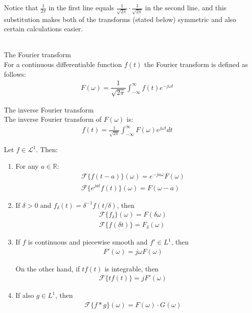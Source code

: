 Notice that $\frac{1}{2\pi}$ in the first line equals $\frac{1}{\sqrt{2\pi}} \cdot \frac{1}{\sqrt{2\pi}}$ in the second line, and this substitution makes both of the transforms (stated below) symmetric and also certain calculations easier. \cite{Page 10, FourierTrans}
\\ \\
\begin{definition}{The Fourier transform}
\\
For a continuous differentiable function $f(t)$ the Fourier transform is defined as follows:
\begin{align*}
F(\omega) = \dfrac{1}{\sqrt{2\pi}} \int_{-\infty}^\infty f(t) e^{-j \omega t}
\end{align*}
\end{definition}

\begin{definition}{The inverse Fourier transform}
\\
The inverse Fourier transform of $F(\omega)$ is:
\begin{align*}
f(t) = \frac{1}{\sqrt{2\pi}} \int_{-\infty}^\infty F(\omega) e^{j \omega t} dt
\end{align*}
\end{definition}

\begin{theorem}
Let $f \in \mathcal{L}^1$. Then:

\begin{enumerate}[label=(\alph*)]
\item For any $a \in \mathbb{R}$:
\begin{align*}
\mathcal{F}\{f(t-a)\}(\omega) = e^{-ja\omega} F(\omega) \\
\mathcal{F}\{e^{jat}f(t)\}(\omega) = F(\omega - a)
\end{align*}

\item If $\delta > 0$ and $f_\delta(t)=\delta^{-1}f(t/\delta)$, then
\begin{align*}
\mathcal{F}\{f_\delta\}(\omega) = F(\delta\omega) \\
\mathcal{F}\{f(\delta t)\} = F_\delta(\omega)
\end{align*}

\item If $f$ is continuous and piecewise smooth and $f' \in L^1$, then
\begin{align*}
F'(\omega) = j\omega F(\omega)
\end{align*}

On the other hand, if $tf(t)$ is integrable, then
\begin{align*}
\mathcal{F}\{tf(t)\} = j F'(\omega)
\end{align*}

\item If also $g \in L^1$, then
\begin{align*}
\mathcal{F}\{f*g\}(\omega) = F(\omega) \cdot G(\omega)
\end{align*}
\end{enumerate}
\end{theorem}

